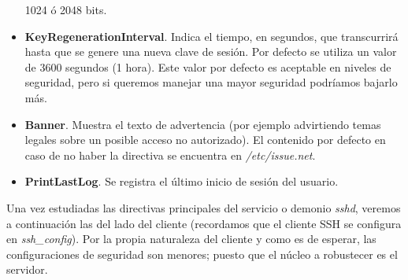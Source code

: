 \documentclass[a4paper, 11pt, titlepage]{article}
\begin{document}
\begin{itemize}
            1024 ó 2048 bits.
            \item \textbf{KeyRegenerationInterval}. Indica el tiempo, en segundos, que transcurrirá hasta que se genere una nueva 
            clave de sesión. Por defecto se utiliza un valor de 3600 segundos (1 hora). Este valor por defecto es aceptable en niveles 
            de seguridad, pero si queremos manejar una mayor seguridad podríamos bajarlo más.
            \item \textbf{Banner}. Muestra el texto de advertencia (por ejemplo advirtiendo temas legales sobre un posible 
            acceso no autorizado). El contenido por defecto en caso de no haber la directiva se encuentra en \textit{/etc/issue.net}.
            \item \textbf{PrintLastLog}. Se registra el último inicio de sesión del usuario.
        \end{itemize}

        Una vez estudiadas las directivas principales del servicio o demonio \textit{sshd}, veremos a continuación las del 
        lado del cliente (recordamos que el cliente SSH se configura en \textit{ssh\_config}). Por la propia naturaleza del 
        cliente y como es de esperar, las configuraciones de seguridad son menores; puesto que el núcleo a robustecer es 
        el servidor.
\end{document}
